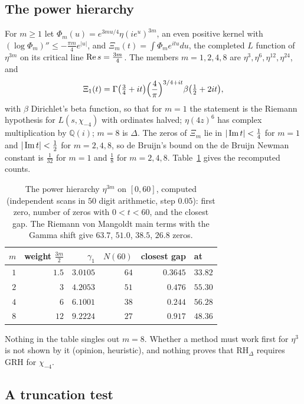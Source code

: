 \subsection{The power hierarchy}

For $m\ge1$ let $\Phi_m(u)=e^{3mu/4}\eta(ie^u)^{3m}$, an even positive kernel with $(\log\Phi_m)''\le-\frac{\pi m}4e^{|u|}$, and $\Xi_m(t)=\int\Phi_me^{itu}du$, the completed $L$ function of $\eta^{3m}$ on its critical line $\operatorname{Re} s=\frac{3m}4$. The members $m=1,2,4,8$ are $\eta^3,\eta^6,\eta^{12},\eta^{24}$, and
\[
\Xi_1(t)=\Gamma\bigl(\tfrac34+it\bigr)\Bigl(\frac4\pi\Bigr)^{3/4+it}\beta\bigl(\tfrac12+2it\bigr),
\]
with $\beta$ Dirichlet's beta function, so that for $m=1$ the statement is the Riemann hypothesis for $L(s,\chi_{-4})$ with ordinates halved; $\eta(4z)^6$ has complex multiplication by $\mathbb Q(i)$; $m=8$ is $\Delta$. The zeros of $\Xi_m$ lie in $|\operatorname{Im} t|<\frac14$ for $m=1$ and $|\operatorname{Im} t|<\frac12$ for $m=2,4,8$, so de Bruijn's bound on the de Bruijn Newman constant is $\frac1{32}$ for $m=1$ and $\frac18$ for $m=2,4,8$. Table~\ref{dl:tab:hier} gives the recomputed counts.

\begin{table}[htbp]
\centering\small
\begin{tabular}{rrrrrl}
\toprule
$m$ & weight $\frac{3m}2$ & $\gamma_1$ & $N(60)$ & closest gap & at\\
\midrule
$1$ & $1.5$ & $3.0105$ & $64$ & $0.3645$ & $33.82$\\
$2$ & $3$ & $4.2053$ & $51$ & $0.476$ & $55.30$\\
$4$ & $6$ & $6.1001$ & $38$ & $0.244$ & $56.28$\\
$8$ & $12$ & $9.2224$ & $27$ & $0.917$ & $48.36$\\
\bottomrule
\end{tabular}
\caption{The power hierarchy $\eta^{3m}$ on $[0,60]$, computed (independent scans in $50$ digit arithmetic, step $0.05$): first zero, number of zeros with $0<t<60$, and the closest gap. The Riemann von Mangoldt main terms with the Gamma shift give $63.7$, $51.0$, $38.5$, $26.8$ zeros.}\label{dl:tab:hier}
\end{table}

Nothing in the table singles out $m=8$. Whether a method must work first for $\eta^3$ is not shown by it (opinion, heuristic), and nothing proves that $\mathrm{RH}_\Delta$ requires GRH for $\chi_{-4}$.

\subsection{A truncation test}

